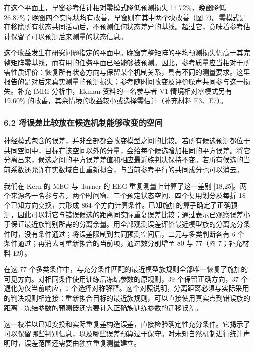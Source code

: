 \documentclass[11pt,a4paper]{article}
\begin{document}
在这个平面上，早窗参考估计相对零模式降低预测损失 14.72\%，晚窗降低
26.87\%；晚窗四个实际块均有改善，早窗则在其中两个块改善（图
7）。零模式是在移除所有状态共同活动后，不预测任何状态差异的基线。超过它，意味着参考估计保留了可以预测后来测量的状态信息。

这个收益发生在研究问题指定的平面中。晚窗完整矩阵的平均预测损失仍高于其完整矩阵零基线，而有用的任务平面已经能够被预测。因此，参考质量应当相对于所需性质评价：恢复所有状态方向与保留某个机制关系，具有不同的测量要求。这里报告的是对后来真实测量的预测损失；参考随时间改变及评价噪声共同参与这一损失。补充
fMRI 分析中，Ekman 资料的一名参与者 V1 情境相对零模式另有 19.60\%
的改善，其余情境的收益较小或选择零估计（补充材料 E3、E7）。

\subsubsection{6.2
将误差比较放在候选机制能够改变的空间}\label{ux5c06ux8befux5deeux6bd4ux8f83ux653eux5728ux5019ux9009ux673aux5236ux80fdux591fux6539ux53d8ux7684ux7a7aux95f4}

神经模式包含的误差，并非全部都会改变模型之间的比较。若所有候选预测都位于共同空间中，目标在该空间以外的分量，会给每个候选增加相同的平方误差。将它分离出来，候选之间的平方误差差值和相应最近族判决保持不变。若所有候选的当前系数还允许在实数域自由重新拟合，与当前参考平行的共同成分也可以消去。

我们在 Kern 的 MEG 与 Turner 的 EEG 重复测量上计算了这一差别
{[}18,25{]}。两个来源各一名参与者，两个时间窗、三个预定状态空间、四个复用划分及每折
18 个已知方向变换，共形成 864
个方向计算条件。已知施加的算子确定了正确预测，因此可以将它与错误候选的距离同实际重复误差比较；通过表示已观察误差小于保证最近族判别所需的分离余量。用全部观测误差评价最近模型族的分离充分条件时，没有条件通过；将误差限制到共同预测空间后，二元与多类判断各有
6 个条件通过；再消去可重新拟合的当前项，通过数分别增至 80 与 77（图
7；补充材料 E9）。

在这 77
个多类条件中，与充分条件匹配的最近模型族规则全部唯一恢复了施加的可见方向。对相同条件使用训练后冻结参数的原规则，39
个保留正确方向，37 个退化为仅当前响应，1
个选择对称解释。这个对照说明，分离距离必须与实际采用的判决规则相连接：重新拟合目标的最近族规则，可以直接使用真实点到错误族的距离；冻结参数的预测器还需要计入正确族训练参数的迁移误差。

这一校准以已知变换和实际重复差构造误差，直接检验确定性充分条件。它揭示了可以保留哪些判别信息，以及哪些误差预算过于保守。对未知自然机制进行统计声明时，误差范围还需要由独立重复测量建立。
\end{document}
